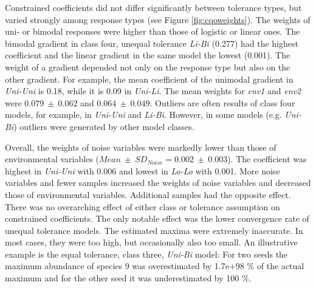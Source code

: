 	Constrained coefficients did not differ significantly between tolerance types, but varied strongly among response types (see Figure \ref{fig:cqoweights}).
	The weights of uni- or bimodal responses were higher than those of logistic or linear ones. 
	The bimodal gradient in class four, unequal tolerance \textit{Li-Bi} (0.277) had the highest coefficient and the linear gradient in the same model the lowest (0.001).
	The weight of a gradient depended not only on the response type but also on the other gradient.
	For example, the mean coefficient of the unimodal gradient in \textit{Uni-Uni} is 0.18, while it is 0.09 in \textit{Uni-Li}. 
	The mean weights for \textit{env1} and \textit{env2} were $0.079\ \pm\ 0.062$ and $0.064\ \pm\ 0.049$. 
	Outliers are often results of class four models, for example, in \textit{Uni-Uni} and \textit{Li-Bi}. 
	However, in some models (e.g. \textit{Uni-Bi}) outliers were generated by other model classes. 

	Overall, the weights of noise variables were markedly lower than those of environmental variables ($Mean\ \pm\ SD_{\scriptscriptstyle Noise} = 0.002\ \pm\ 0.003$).  
	The coefficient was highest in \textit{Uni-Uni} with 0.006 and lowest in \textit{Lo-Lo} with 0.001.
	More noise variables and fewer samples increased the weights of noise variables and decreased those of environmental variables. 
	Additional samples had the opposite effect. \\
	
	There was no overarching effect of either class or tolerance assumption on constrained coefficients. 
	The only notable effect was the lower convergence rate of unequal tolerance models.
	The estimated maxima were extremely inaccurate. 
	In most cases, they were too high, but occasionally also too small. 
	An illustrative example is the equal tolerance, class three, \textit{Uni-Bi} model: For two seeds the maximum abundance of species 9 was overestimated by 1.7e+98 \% of the actual maximum and for the other seed it was underestimated by 100 \%. 
	
